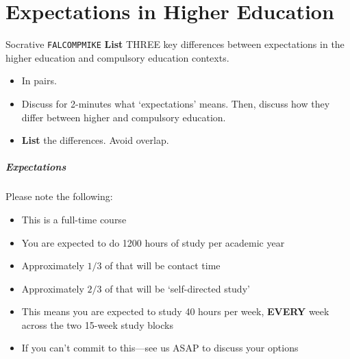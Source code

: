 \part{Expectations in Higher Education}
\frame{\partpage}

\begin{frame}{Socrative \texttt{FALCOMPMIKE}}
	\textbf{List} THREE key differences between expectations in the higher education and compulsory education contexts.
	
	\begin{itemize}
		\item In pairs.
		\item Discuss for 2-minutes what `expectations' means. Then, discuss how they differ between higher and compulsory education.
		\item \textbf{List} the differences. Avoid overlap.
	\end{itemize}
\end{frame}

\begin{frame}
	\frametitle{Expectations}
	
	Please note the following:
	
	\begin{itemize}
		\item This is a full-time course
		\item You are expected to do 1200 hours of study per academic year
		\item Approximately $1/3$ of that will be contact time
		\item Approximately $2/3$ of that will be `self-directed study'
		\item This means you are expected to study 40 hours per week, \textbf{EVERY} week across the two 15-week study blocks
		\item If you can't commit to this---see us ASAP to discuss your options
	\end{itemize}

\end{frame}

